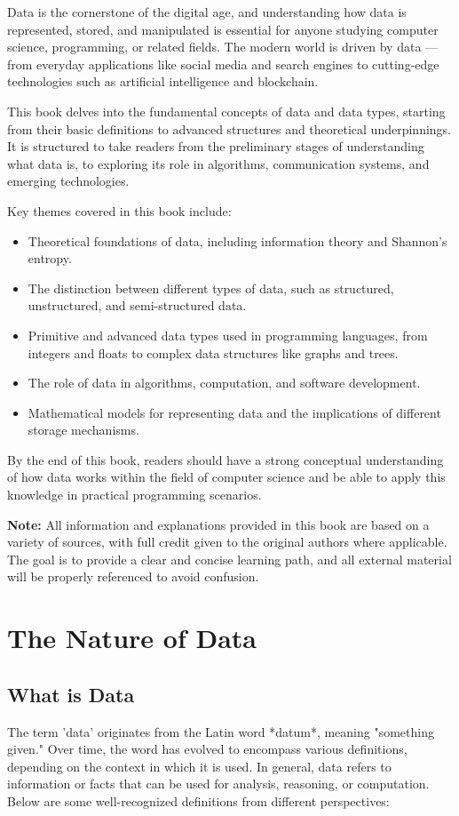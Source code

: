 \documentclass[12pt, oneside]{book}
\begin{document}
Data is the cornerstone of the digital age, and understanding how data is represented, stored, and manipulated is essential for anyone studying computer science, programming, or related fields. The modern world is driven by data — from everyday applications like social media and search engines to cutting-edge technologies such as artificial intelligence and blockchain.

This book delves into the fundamental concepts of data and data types, starting from their basic definitions to advanced structures and theoretical underpinnings. It is structured to take readers from the preliminary stages of understanding what data is, to exploring its role in algorithms, communication systems, and emerging technologies.

Key themes covered in this book include:
\begin{itemize}
	\item Theoretical foundations of data, including information theory and Shannon's entropy.
	\item The distinction between different types of data, such as structured, unstructured, and semi-structured data.
	\item Primitive and advanced data types used in programming languages, from integers and floats to complex data structures like graphs and trees.
	\item The role of data in algorithms, computation, and software development.
	\item Mathematical models for representing data and the implications of different storage mechanisms.
\end{itemize}

By the end of this book, readers should have a strong conceptual understanding of how data works within the field of computer science and be able to apply this knowledge in practical programming scenarios.

\vspace{0.5cm}
\textbf{Note:} All information and explanations provided in this book are based on a variety of sources, with full credit given to the original authors where applicable. The goal is to provide a clear and concise learning path, and all external material will be properly referenced to avoid confusion.

\chapter{The Nature of Data}
\section{What is Data}
The term 'data' originates from the Latin word *datum*, meaning "something given." Over time, the word has evolved to encompass various definitions, depending on the context in which it is used. In general, data refers to information or facts that can be used for analysis, reasoning, or computation. Below are some well-recognized definitions from different perspectives:\\
\end{document}
